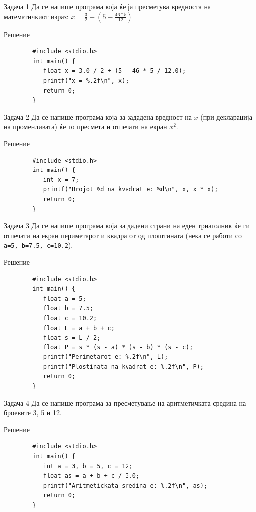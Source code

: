 \begin{frame}[fragile]{Задача 1}
	Да се напише програма која ќе ја пресметува вредноста на математичкиот израз:
	$ x = \frac{3}{2} + (5 - \frac{46 * 5}{12})$
	\begin{exampleblock}{Решение}
		\begin{lstlisting}
		#include <stdio.h>
		int main() {
		   float x = 3.0 / 2 + (5 - 46 * 5 / 12.0);
		   printf("x = %.2f\n", x);
		   return 0;
		}
		\end{lstlisting}
	\end{exampleblock}
\end{frame}

\begin{frame}[fragile]{Задача 2}
Да се напише програма која за зададена вредност на $ x $ (при декларација на променливата) ќе го пресмета и отпечати на екран $ x^2 $.
	\begin{exampleblock}{Решение}
		\begin{lstlisting}
		#include <stdio.h>
		int main() {
		   int x = 7;
		   printf("Brojot %d na kvadrat e: %d\n", x, x * x);
		   return 0;
		}
		\end{lstlisting}
	\end{exampleblock}
\end{frame}

\begin{frame}[fragile]{Задача 3}
Да се напише програма која за дадени страни на еден триаголник ќе ги отпечати на екран периметарот 
и квадратот од плоштината (нека се работи со \texttt{a=5, b=7.5, c=10.2}).
	\begin{exampleblock}{Решение}
		\begin{lstlisting}
		#include <stdio.h>
		int main() {
		   float a = 5;
		   float b = 7.5;
		   float c = 10.2;
		   float L = a + b + c;
		   float s = L / 2;
		   float P = s * (s - a) * (s - b) * (s - c);
		   printf("Perimetarot e: %.2f\n", L);
		   printf("Plostinata na kvadrat e: %.2f\n", P);
		   return 0;
		}
		\end{lstlisting}
	\end{exampleblock}
\end{frame}

\begin{frame}[fragile]{Задача 4}
Да се напише програма за пресметување на аритметичката средина на броевите 3, 5 и 12.
	\begin{exampleblock}{Решение}
		\begin{lstlisting}
		#include <stdio.h>
		int main() {
		   int a = 3, b = 5, c = 12;
		   float as = a + b + c / 3.0;
		   printf("Aritmetickata sredina e: %.2f\n", as);
		   return 0;
		}
		\end{lstlisting}
	\end{exampleblock}
\end{frame}

